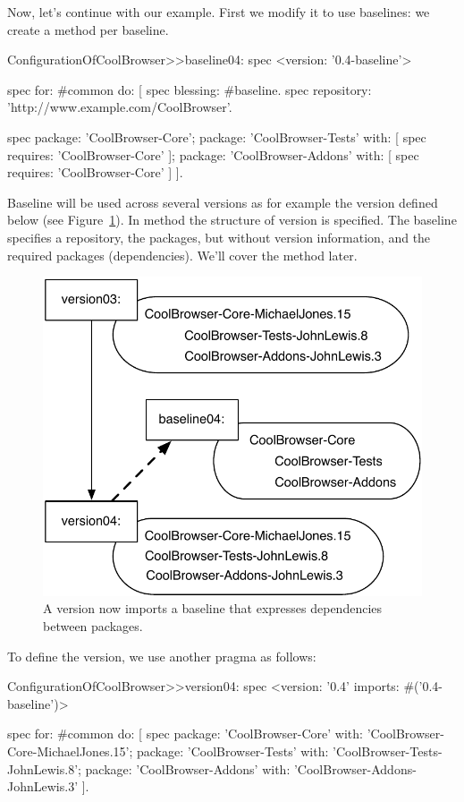 \documentclass[a4paper,10pt,twoside]{book}
\begin{document}
Now, let's continue with our example. First we modify it to use baselines: we create a method per baseline. 

\begin{code}{}
ConfigurationOfCoolBrowser>>baseline04: spec 
	<version: '0.4-baseline'>
	
	spec for: #common do: [
		spec blessing: #baseline.
		spec repository: 'http://www.example.com/CoolBrowser'.
		
		spec 
			package: 'CoolBrowser-Core';
			package: 'CoolBrowser-Tests' with: [ spec requires: 'CoolBrowser-Core' ];
			package: 'CoolBrowser-Addons' with: [ spec requires: 'CoolBrowser-Core' ] ].

\end{code}

Baseline  will be used across several versions as for example the version  defined below (see Figure~\ref{fig:version04}). In method  the structure of version  is specified. The baseline specifies a repository, the packages, but without version information, and the required packages (dependencies). We'll cover the  method  later.

\begin{figure}
\begin{center}
\includegraphics[width=0.6\linewidth]{version04}
\caption{A version now imports a baseline that expresses dependencies between packages.\label{fig:version04}}
\end{center}
\end{figure} 

To define the version, we use another pragma  as follows:

\begin{code}{}
ConfigurationOfCoolBrowser>>version04: spec 
	<version: '0.4' imports: #('0.4-baseline')>
	
	spec for: #common do: [
		spec 
			package: 'CoolBrowser-Core' with: 'CoolBrowser-Core-MichaelJones.15';
			package: 'CoolBrowser-Tests' with: 'CoolBrowser-Tests-JohnLewis.8';
			package: 'CoolBrowser-Addons' with: 'CoolBrowser-Addons-JohnLewis.3' ].
\end{code}
\end{document}
